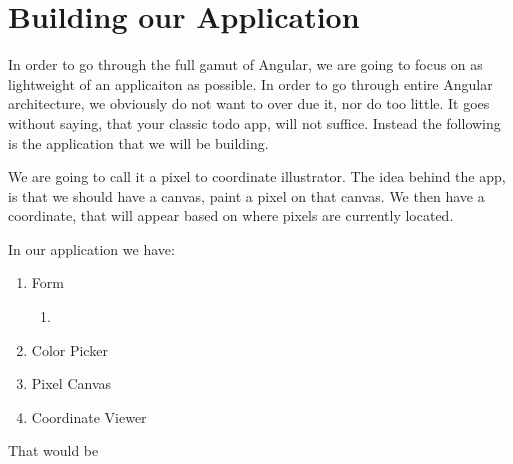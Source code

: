 \maketitle{}
\section{ Building our Application }

In order to go through the full gamut of Angular, we are going to focus on as
lightweight of an applicaiton as possible. In order to go through entire Angular
architecture, we obviously do not want to over due it, nor do too little. It
goes without saying, that your classic todo app, will not suffice. Instead the
following is the application that we will be building.

We are going to call it a pixel to coordinate illustrator. The idea behind the
app, is that we should have a canvas, paint a pixel on that canvas. We then have
a coordinate, that will appear based on where pixels are currently located.

In our application we have:
\begin{enumerate}
  \item Form
    \begin{enumerate}
      \item
    \end{enumerate}
  \item Color Picker
  \item Pixel Canvas
  \item Coordinate Viewer
\end{enumerate}

That would be
